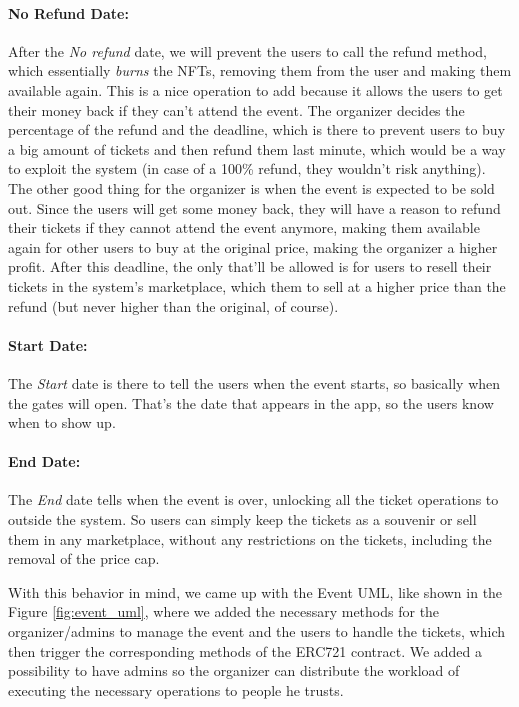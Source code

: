 \paragraph{No Refund Date:} After the \textit{No refund} date, we will prevent the users to call the refund
method, which essentially \textit{burns} the NFTs, removing them from the user
and making them available again. This is a nice operation to add because it
allows the users to get their money back if they can't attend the event. The
organizer decides the percentage of the refund and the deadline, which is there
to prevent users to buy a big amount of tickets and then refund them last
minute, which would be a way to exploit the system (in case of a 100\% refund,
they wouldn't risk anything). The other good thing for the organizer is when
the event is expected to be sold out. Since the users will get some money back,
they will have a reason to refund their tickets if they cannot attend the event
anymore, making them available again for other users to buy at the original
price, making the organizer a higher profit. After this deadline, the only
that'll be allowed is for users to resell their tickets in the system's
marketplace, which them to sell at a higher price than the refund (but never
higher than the original, of course).

\paragraph{Start Date:} The \textit{Start} date is there to tell the users when the event starts, so
basically when the gates will open. That's the date that appears in the app, so
the users know when to show up.

\paragraph{End Date:} The \textit{End} date tells when the event is over, unlocking all the ticket
operations to outside the system. So users can simply keep the tickets as a
souvenir or sell them in any marketplace, without any restrictions on the
tickets, including the removal of the price cap.

With this behavior in mind, we came up with the Event UML, like shown in the
Figure \ref{fig:event_uml}, where we added the necessary methods for the
organizer/admins to manage the event and the users to handle the tickets, which
then trigger the corresponding methods of the ERC721 contract. We added a
possibility to have admins so the organizer can distribute the workload of
executing the necessary operations to people he trusts.

